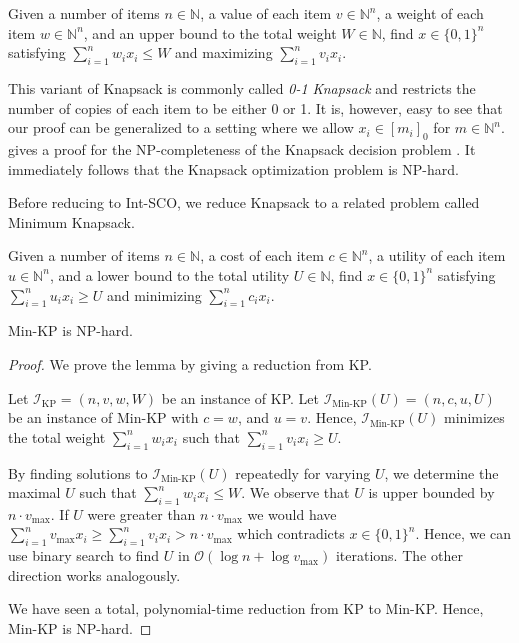 \begin{problem}[Knapsack (KP)]
Given a number of items $n \in \mathbb{N}$, a value of each item $v \in \mathbb{N}^n$, a weight of each item $w \in \mathbb{N}^n$, and an upper bound to the total weight $W \in \mathbb{N}$, find $x \in \{0,1\}^n$ satisfying $\sum_{i = 1}^n w_i x_i \leq W$ and maximizing $\sum_{i=1}^n v_i x_i$.
\end{problem}

This variant of Knapsack is commonly called \emph{0-1 Knapsack} and restricts the number of copies of each item to be either 0 or 1. It is, however, easy to see that our proof can be generalized to a setting where we allow $x_i \in [m_i]_0$ for $m \in \mathbb{N}^n$. \citeauthor*{Williamson2014} gives a proof for the NP-completeness of the Knapsack decision problem \cite{Williamson2014}. It immediately follows that the Knapsack optimization problem is NP-hard.

Before reducing to Int-SCO, we reduce Knapsack to a related problem called Minimum Knapsack.

\begin{problem}
Given a number of items $n \in \mathbb{N}$, a cost of each item $c \in \mathbb{N}^n$, a utility of each item $u \in \mathbb{N}^n$, and a lower bound to the total utility $U \in \mathbb{N}$, find $x \in \{0,1\}^n$ satisfying $\sum_{i = 1}^n u_i x_i \geq U$ and minimizing $\sum_{i=1}^n c_i x_i$.
\end{problem}

\begin{lemma}
Min-KP is NP-hard.
\end{lemma}
\begin{proof}
We prove the lemma by giving a reduction from KP.

Let $\mathcal{I}_{\text{KP}} = (n, v, w, W)$ be an instance of KP. Let $\mathcal{I}_{\text{Min-KP}}(U) = (n, c, u, U)$ be an instance of Min-KP with $c = w$, and $u = v$. Hence, $\mathcal{I}_{\text{Min-KP}}(U)$ minimizes the total weight $\sum_{i=1}^n w_i x_i$ such that $\sum_{i=1}^n v_i x_i \geq U$.

By finding solutions to $\mathcal{I}_{\text{Min-KP}}(U)$ repeatedly for varying $U$, we determine the maximal $U$ such that $\sum_{i=1}^n w_i x_i \leq W$. We observe that $U$ is upper bounded by $n \cdot v_{\text{max}}$. If $U$ were greater than $n \cdot v_{\text{max}}$ we would have $\sum_{i=1}^n v_{\text{max}} x_i \geq \sum_{i=1}^n v_i x_i > n \cdot v_{\text{max}}$ which contradicts $x \in \{0,1\}^n$. Hence, we can use binary search to find $U$ in $\mathcal{O}(\log n + \log v_{\text{max}})$ iterations. The other direction works analogously.

We have seen a total, polynomial-time reduction from KP to Min-KP. Hence, Min-KP is NP-hard.
\end{proof}

